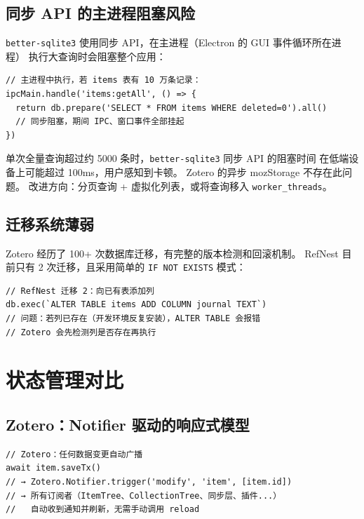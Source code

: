 \documentclass[12pt, a4paper]{article}
\begin{document}
\subsection{同步 API 的主进程阻塞风险}

\texttt{better-sqlite3} 使用同步 API，在主进程（Electron 的 GUI 事件循环所在进程）
执行大查询时会阻塞整个应用：

\begin{lstlisting}[language={}]
// 主进程中执行，若 items 表有 10 万条记录：
ipcMain.handle('items:getAll', () => {
  return db.prepare('SELECT * FROM items WHERE deleted=0').all()
  // 同步阻塞，期间 IPC、窗口事件全部挂起
})
\end{lstlisting}

\begin{tcolorbox}[warnbox, title={数据量警戒线}]
  单次全量查询超过约 5000 条时，\texttt{better-sqlite3} 同步 API 的阻塞时间
  在低端设备上可能超过 100ms，用户感知到卡顿。
  Zotero 的异步 mozStorage 不存在此问题。
  改进方向：分页查询 + 虚拟化列表，或将查询移入 \texttt{worker\_threads}。
\end{tcolorbox}

\subsection{迁移系统薄弱}

Zotero 经历了 100+ 次数据库迁移，有完整的版本检测和回滚机制。
RefNest 目前只有 2 次迁移，且采用简单的 \texttt{IF NOT EXISTS} 模式：

\begin{lstlisting}[language={}]
// RefNest 迁移 2：向已有表添加列
db.exec(`ALTER TABLE items ADD COLUMN journal TEXT`)
// 问题：若列已存在（开发环境反复安装），ALTER TABLE 会报错
// Zotero 会先检测列是否存在再执行
\end{lstlisting}

\section{状态管理对比}

\subsection{Zotero：Notifier 驱动的响应式模型}

\begin{lstlisting}[language={}]
// Zotero：任何数据变更自动广播
await item.saveTx()
// → Zotero.Notifier.trigger('modify', 'item', [item.id])
// → 所有订阅者（ItemTree、CollectionTree、同步层、插件...）
//   自动收到通知并刷新，无需手动调用 reload
\end{lstlisting}
\end{document}
